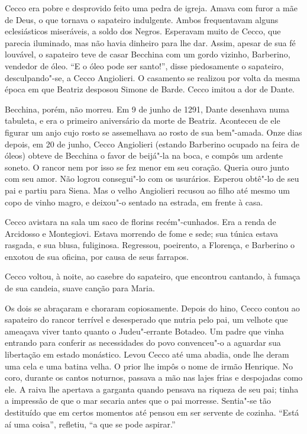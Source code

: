 Cecco era pobre e desprovido feito uma pedra de igreja. Amava com furor a
mãe de Deus, o que tornava o sapateiro indulgente. Ambos frequentavam
alguns eclesiásticos miseráveis, a soldo dos Negros. Esperavam muito de
Cecco, que parecia iluminado, mas não havia dinheiro para lhe dar. Assim,
apesar de sua fé louvável, o sapateiro teve de casar Becchina com um gordo
vizinho, Barberino, vendedor de óleo. “E o óleo pode ser santo!”, disse
piedosamente o sapateiro, desculpando"-se, a Cecco Angiolieri. O casamento
se realizou por volta da mesma época em que Beatriz desposou Simone de
Barde. Cecco imitou a dor de Dante.

Becchina, porém, não morreu. Em 9 de junho de 1291, Dante desenhava numa
tabuleta, e era o primeiro aniversário da morte de Beatriz. Aconteceu de
ele figurar um anjo cujo rosto se assemelhava ao rosto de sua
bem"-amada. Onze dias depois, em 20 de junho, Cecco Angiolieri (estando
Barberino ocupado na feira de óleos) obteve de Becchina o favor de
beijá"-la na boca, e compôs um ardente soneto. O rancor nem por isso se fez
menor em seu coração. Queria ouro junto com seu amor. Não logrou
consegui"-lo com os usurários. Esperou obtê"-lo de seu pai e partiu para
Siena. Mas o velho Angiolieri recusou ao filho até mesmo um copo de vinho
magro, e deixou"-o sentado na estrada, em frente à casa.

Cecco avistara na sala um saco de florins recém"-cunhados. Era a renda de
Arcidosso e Montegiovi. Estava morrendo de fome e sede; sua túnica estava
rasgada, e sua blusa, fuliginosa. Regressou, poeirento, a Florença, e
Barberino o enxotou de sua oficina, por causa de seus farrapos.

Cecco voltou, à noite, ao casebre do sapateiro, que encontrou cantando, à
fumaça de sua candeia, suave canção para Maria.

Os dois se abraçaram e choraram copiosamente. Depois do hino, Cecco contou
ao sapateiro do rancor terrível e desesperado que nutria pelo pai, um
velhote que ameaçava viver tanto quanto o Judeu"-errante Botadeo. Um padre
que vinha entrando para conferir as necessidades do povo convenceu"-o a
aguardar sua libertação em estado monástico. Levou Cecco até uma abadia,
onde lhe deram uma cela e uma batina velha. O prior lhe impôs o nome de
irmão Henrique. No coro, durante os cantos noturnos, passava a mão nas
lajes frias e despojadas como ele. A raiva lhe apertava a garganta quando
pensava na riqueza de seu pai; tinha a impressão de que o mar secaria
antes que o pai morresse. Sentia"-se tão destituído que em certos momentos
até pensou em ser servente de cozinha. “Está aí uma coisa'', refletiu, ``a que
se pode aspirar.”

